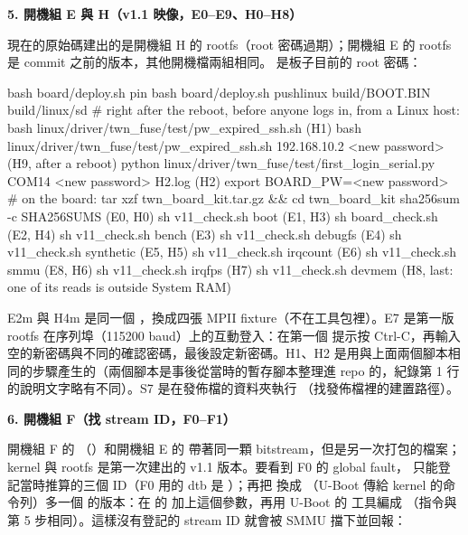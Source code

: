 \textbf{5. 開機組 E 與 H（v1.1 映像，E0--E9、H0--H8）}

現在的原始碼建出的是開機組 H 的 rootfs（root 密碼過期）；開機組 E 的 rootfs 是 commit  之前的版本，其他開機檔兩組相同。 是板子目前的 root 密碼：

\begin{cmdline}
bash board/deploy.sh pin
bash board/deploy.sh pushlinux build/BOOT.BIN build/linux/sd
# right after the reboot, before anyone logs in, from a Linux host:
bash linux/driver/twn_fuse/test/pw_expired_ssh.sh                                        (H1)
bash linux/driver/twn_fuse/test/pw_expired_ssh.sh 192.168.10.2 <new password>             (H9, after a reboot)
python linux/driver/twn_fuse/test/first_login_serial.py COM14 <new password> H2.log      (H2)
export BOARD_PW=<new password>
# on the board: tar xzf twn_board_kit.tar.gz && cd twn_board_kit
sha256sum -c SHA256SUMS (E0, H0)   sh v11_check.sh boot (E1, H3)   sh board_check.sh (E2, H4)
sh v11_check.sh bench (E3)   sh v11_check.sh debugfs (E4)   sh v11_check.sh synthetic (E5, H5)
sh v11_check.sh irqcount (E6)   sh v11_check.sh smmu (E8, H6)   sh v11_check.sh irqfps (H7)
sh v11_check.sh devmem (H8, last: one of its reads is outside System RAM)
\end{cmdline}

E2m 與 H4m 是同一個 ，換成四張 MPII fixture（不在工具包裡）。E7 是第一版 rootfs 在序列埠（115200 baud）上的互動登入：在第一個  提示按 Ctrl-C，再輸入空的新密碼與不同的確認密碼，最後設定新密碼。H1、H2 是用與上面兩個腳本相同的步驟產生的（兩個腳本是事後從當時的暫存腳本整理進 repo 的，紀錄第 1 行的說明文字略有不同）。S7 是在發佈檔的資料夾執行 （找發佈檔裡的建置路徑）。

\textbf{6. 開機組 F（找 stream ID，F0--F1）}

開機組 F 的 （）和開機組 E 的  帶著同一顆 bitstream，但是另一次打包的檔案；kernel 與 rootfs 是第一次建出的 v1.1 版本。要看到 F0 的 global fault， 只能登記當時推算的三個 ID（F0 用的 dtb 是 ）；再把  換成 （U-Boot 傳給 kernel 的命令列）多一個  的版本：在  的  加上這個參數，再用 U-Boot 的  工具編成 （指令與  第 5 步相同）。這樣沒有登記的 stream ID 就會被 SMMU 擋下並回報：

